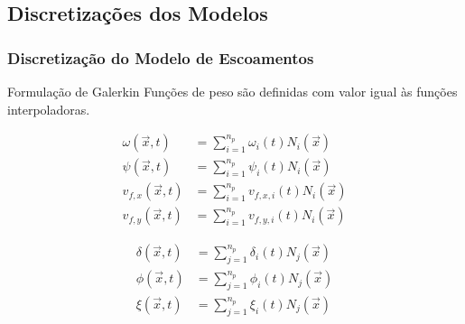 \documentclass{beamer}
\begin{document}
\subsection{Discretizações dos Modelos}
\begin{frame}
  \frametitle{Discretização do Modelo de Escoamentos}
  
  \begin{block}{Formulação de Galerkin}
    Funções de peso são definidas com valor igual às funções interpoladoras.
    
    \begin{minipage}{.45\textwidth}
      \vspace*{-\baselineskip}\setlength\belowdisplayshortskip{0pt} %
      \begin{align*}
	\omega(\vec{x}, t) &= \sum_{i=1}^{n_p} \omega_i(t) N_i(\vec{x}) \\
	\psi(\vec{x}, t) &= \sum_{i=1}^{n_p} \psi_i(t) N_i(\vec{x}) \\
	v_{f,x}(\vec{x}, t) &= \sum_{i=1}^{n_p} v_{f,x,i}(t) N_i(\vec{x}) \\
	v_{f,y}(\vec{x}, t) &= \sum_{i=1}^{n_p} v_{f,y,i}(t) N_i(\vec{x}) 
      \end{align*}
    \end{minipage}
    \hfill
    \begin{minipage}{.45\textwidth}
      \vspace*{-\baselineskip}\setlength\belowdisplayshortskip{0pt} %
      \begin{align*}
	\delta(\vec{x}, t) &= \sum_{j=1}^{n_p} \delta_i(t) N_j(\vec{x}) \\
	\phi(\vec{x}, t) &= \sum_{j=1}^{n_p} \phi_i(t) N_j(\vec{x}) \\
	\xi(\vec{x}, t) &= \sum_{j=1}^{n_p} \xi_i(t) N_j(\vec{x})
      \end{align*}
    \end{minipage}
  \end{block}
\end{frame}
\end{document}
